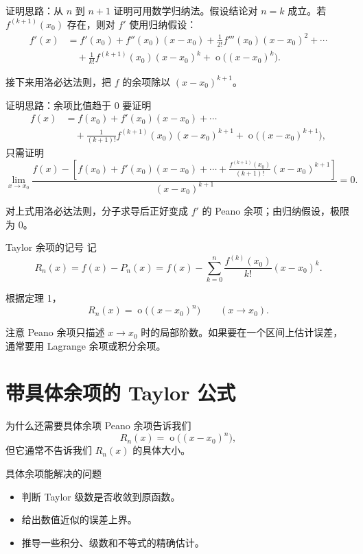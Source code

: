 \documentclass[aspectratio=169,11pt]{ctexbeamer}
\newcommand{\ord}{\operatorname{o}}
\begin{document}
\begin{frame}{证明思路：从 $n$ 到 $n+1$}
\small
证明可用数学归纳法。假设结论对 $n=k$ 成立。若 $f^{(k+1)}(x_0)$ 存在，则对 $f'$ 使用归纳假设：
\[
\begin{aligned}
f'(x)
&= f'(x_0)+f''(x_0)(x-x_0)
  +\frac{1}{2!}f'''(x_0)(x-x_0)^2+\cdots\\
&\quad
  +\frac{1}{k!}f^{(k+1)}(x_0)(x-x_0)^k
  +\ord\bigl((x-x_0)^k\bigr).
\end{aligned}
\]

接下来用洛必达法则，把 $f$ 的余项除以 $(x-x_0)^{k+1}$。
\end{frame}

\begin{frame}{证明思路：余项比值趋于 $0$}
\footnotesize
要证明
\[
\begin{aligned}
f(x)
&= f(x_0)+f'(x_0)(x-x_0)+\cdots\\
&\quad+\frac{1}{(k+1)!}f^{(k+1)}(x_0)(x-x_0)^{k+1}
 +\ord\bigl((x-x_0)^{k+1}\bigr),
\end{aligned}
\]
只需证明
\[
\lim_{x\to x_0}
\frac{
f(x)-\left[f(x_0)+f'(x_0)(x-x_0)+\cdots+
\frac{f^{(k+1)}(x_0)}{(k+1)!}(x-x_0)^{k+1}\right]
}{(x-x_0)^{k+1}}
=0.
\]

对上式用洛必达法则，分子求导后正好变成 $f'$ 的 Peano 余项；由归纳假设，极限为 $0$。
\end{frame}

\begin{frame}{Taylor 余项的记号}
\small
记
\[
  R_n(x)=f(x)-P_n(x)
  =
  f(x)-\sum_{k=0}^n
  \frac{f^{(k)}(x_0)}{k!}(x-x_0)^k.
\]

根据定理 1，
\[
  R_n(x)=\ord\bigl((x-x_0)^n\bigr)\qquad (x\to x_0).
\]

\begin{block}{注意}
Peano 余项只描述 $x\to x_0$ 时的局部阶数。如果要在一个区间上估计误差，通常要用 Lagrange 余项或积分余项。
\end{block}
\end{frame}

\section{带具体余项的 Taylor 公式}

\begin{frame}{为什么还需要具体余项}
\small
Peano 余项告诉我们
\[
  R_n(x)=\ord\bigl((x-x_0)^n\bigr),
\]
但它通常不告诉我们 $R_n(x)$ 的具体大小。

\begin{block}{具体余项能解决的问题}
\begin{itemize}
  \item 判断 Taylor 级数是否收敛到原函数。
  \item 给出数值近似的误差上界。
  \item 推导一些积分、级数和不等式的精确估计。
\end{itemize}
\end{block}
\end{frame}
\end{document}
